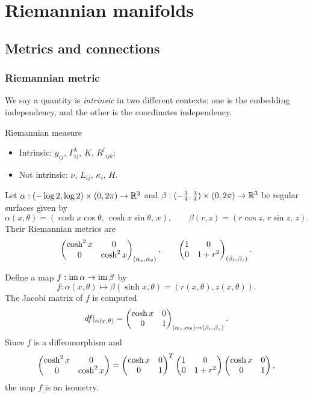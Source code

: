 \documentclass{../../large}
\renewcommand{\a}{\alpha}
\begin{document}
\part{Riemannian manifolds}




\chapter{Metrics and connections}
\section{Riemannian metric}
We say a quantity is \emph{intrinsic} in two different contexts: one is the embedding independency, and the other is the coordinates independency.

Riemannian measure

\begin{itemize}
\item Intrinsic: $g_{ij}$, $\Gamma_{ij}^k$, $K$, ${R^l}_{ijk}$;
\item Not intrinsic: $\nu$, $L_{ij}$, $\kappa_i$, $H$.
\end{itemize}

\begin{ex}
Let $\a:(-\log2,\log2)\times(0,2\pi)\to\R^3$ and $\beta:(-\frac34,\frac34)\times(0,2\pi)\to\mathbb{R}^3$ be regular surfaces given by
\[\a(x,\theta)=(\cosh x\cos\theta,\,\cosh x\sin\theta,\,x),\qquad
\beta(r,z)=(r\cos z,\,r\sin z,\,z).\]
Their Riemannian metrics are
\[\mat{\cosh^2x&0\\0&\cosh^2x}_{(\a_x,\a_\theta)},\qquad\mat{1&0\\0&1+r^2}_{(\beta_r,\beta_z)}.\]

Define a map $f:\im\a\to\im\beta$ by
\[f:\a(x,\theta)\mapsto\beta(\sinh x,\theta)=(r(x,\theta),z(x,\theta)).\]
The Jacobi matrix of $f$ is computed
\[df|_{\a(x,\theta)}=\mat{\cosh x&0\\0&1}_{(\a_x,\a_\theta)\to(\beta_r,\beta_z)}.\]
Since $f$ is a diffeomorphism and
\[\begin{pmatrix}\cosh^2x&0\\0&\cosh^2x\end{pmatrix}=\begin{pmatrix}\cosh x&0\\0&1\end{pmatrix}^T\begin{pmatrix}1&0\\0&1+r^2\end{pmatrix}\begin{pmatrix}\cosh x&0\\0&1\end{pmatrix},\]
the map $f$ is an isometry.
\end{ex}
\end{document}
